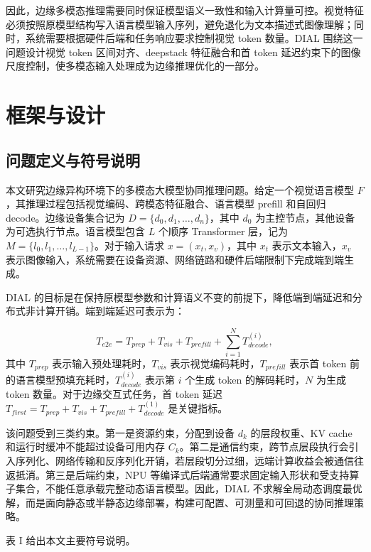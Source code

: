 \documentclass[10pt,a4paper,twocolumn]{ctexart}
\begin{document}
因此，边缘多模态推理需要同时保证模型语义一致性和输入计算量可控。视觉特征必须按照原模型结构写入语言模型输入序列，避免退化为文本描述式图像理解；同时，系统需要根据硬件后端和任务响应要求控制视觉 token 数量。DIAL 围绕这一问题设计视觉 token 区间对齐、deepstack 特征融合和首 token 延迟约束下的图像尺度控制，使多模态输入处理成为边缘推理优化的一部分。

\section{框架与设计}

\subsection{问题定义与符号说明}

本文研究边缘异构环境下的多模态大模型协同推理问题。给定一个视觉语言模型 \(F\)，其推理过程包括视觉编码、跨模态特征融合、语言模型 prefill 和自回归 decode。边缘设备集合记为 \(D=\{d_0,d_1,\ldots,d_n\}\)，其中 \(d_0\) 为主控节点，其他设备为可选执行节点。语言模型包含 \(L\) 个顺序 Transformer 层，记为 \(M=\{l_0,l_1,\ldots,l_{L-1}\}\)。对于输入请求 \(x=(x_t,x_v)\)，其中 \(x_t\) 表示文本输入，\(x_v\) 表示图像输入，系统需要在设备资源、网络链路和硬件后端限制下完成端到端生成。

DIAL 的目标是在保持原模型参数和计算语义不变的前提下，降低端到端延迟和分布式非计算开销。端到端延迟可表示为：

\[
T_{e2e}=T_{prep}+T_{vis}+T_{prefill}+\sum_{i=1}^{N}T_{decode}^{(i)},
\]
其中 \(T_{prep}\) 表示输入预处理耗时，\(T_{vis}\) 表示视觉编码耗时，\(T_{prefill}\) 表示首 token 前的语言模型预填充耗时，\(T_{decode}^{(i)}\) 表示第 \(i\) 个生成 token 的解码耗时，\(N\) 为生成 token 数量。对于边缘交互式任务，首 token 延迟 \(T_{first}=T_{prep}+T_{vis}+T_{prefill}+T_{decode}^{(1)}\) 是关键指标。

该问题受到三类约束。第一是资源约束，分配到设备 \(d_k\) 的层段权重、KV cache 和运行时缓冲不能超过设备可用内存 \(C_k\)。第二是通信约束，跨节点层段执行会引入序列化、网络传输和反序列化开销，若层段切分过细，远端计算收益会被通信往返抵消。第三是后端约束，NPU 等编译式后端通常要求固定输入形状和受支持算子集合，不能任意承载完整动态语言模型。因此，DIAL 不求解全局动态调度最优解，而是面向静态或半静态边缘部署，构建可配置、可测量和可回退的协同推理策略。

表 I 给出本文主要符号说明。
\end{document}
